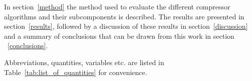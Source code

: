 \documentclass[../main2.tex]{subfiles}
\providecommand{\rootdir}{..}
\begin{document}
In section~\ref{method} the method used to evaluate the different compressor algorithms and their subcomponents is described. The results are presented in section~\ref{results}, followed by a discussion of these results in section~\ref{discussion} and a summary of conclusions that can be drawn from this work in section ~\ref{conclusions}.


Abbreviations, quantities, variables etc. are listed in Table~\ref{tab:list_of_quantities} for convenience.

\end{document}
